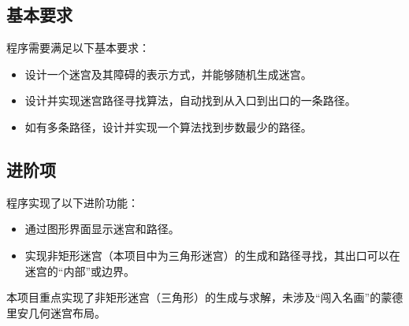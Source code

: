 \documentclass[UTF8]{report}
\theoremstyle{MyLineTheoremStyle} %
\theoremstyle{MyBlockTheoremStyle} %
\theoremstyle{MySubsubsectionStyle} %
\begin{document}
\subsection{基本要求}
程序需要满足以下基本要求：
\begin{itemize}
    \item 设计一个迷宫及其障碍的表示方式，并能够随机生成迷宫。
    \item 设计并实现迷宫路径寻找算法，自动找到从入口到出口的一条路径。
    \item 如有多条路径，设计并实现一个算法找到步数最少的路径。
\end{itemize}

\subsection{进阶项}
程序实现了以下进阶功能：
\begin{itemize}
    \item 通过图形界面显示迷宫和路径。
    \item 实现非矩形迷宫（本项目中为三角形迷宫）的生成和路径寻找，其出口可以在迷宫的“内部”或边界。
\end{itemize}
本项目重点实现了非矩形迷宫（三角形）的生成与求解，未涉及“闯入名画”的蒙德里安几何迷宫布局。
\end{document}
